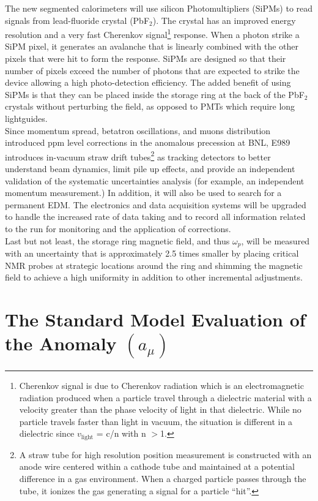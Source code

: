 \documentclass{outhesis}
\begin{document}
The new segmented calorimeters will use silicon Photomultipliers (SiPMs) to read signals from lead-fluoride crystal (PbF$_2$). The crystal has an improved energy resolution and a very fast Cherenkov signal\footnote{Cherenkov signal is due to Cherenkov radiation which is an electromagnetic radiation produced when a particle travel through a dielectric material with a velocity greater than the phase velocity of light in that dielectric. While no particle travels faster than light in vacuum, the situation is different in a dielectric since $v_\text{light}$ = c/n with n $>$1.} response. When a photon strike a SiPM pixel, it generates an avalanche that is linearly combined with the other pixels that were hit to form the response. SiPMs are designed so that their number of pixels exceed the number of photons that are expected to strike the device allowing a high photo-detection efficiency. The added benefit of using SiPMs is that they can be placed inside the storage ring at the back of the PbF$_2$ crystals without perturbing the field, as opposed to PMTs which require long lightguides. \\
Since momentum spread, betatron oscillations, and muons distribution introduced ppm level corrections in the anomalous precession at BNL, E989 introduces in-vacuum straw drift tubes\footnote{A straw tube for high resolution position measurement is constructed with an anode wire centered within a cathode tube and maintained at a potential difference in a gas environment.  When a charged particle passes through the tube, it ionizes the gas generating a signal for a particle ``hit''. } as tracking detectors to better understand beam dynamics, limit pile up effects, and provide an independent validation of the systematic uncertainties analysis (for example, an independent momentum measurement.) In addition, it will also be used to search for a permanent EDM. The electronics and data acquisition systems will be upgraded to handle the increased rate of data taking and to record all information related to the run for monitoring and the application of corrections. \\
Last but not least, the storage ring magnetic field, and thus $\omega_p$, will be measured with an uncertainty that is approximately 2.5 times smaller by placing critical NMR probes at strategic locations around the ring and shimming the magnetic field to achieve a high uniformity in addition to other incremental adjustments. 


\section{The Standard Model Evaluation of the Anomaly $\left(a_{\mu}\right)$}
\label{sm}
\end{document}
